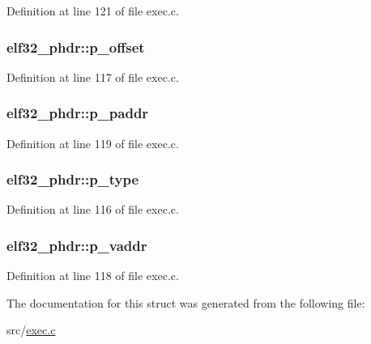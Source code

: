 Definition at line 121 of file exec.\+c.

\hypertarget{structelf32__phdr_af88bab5054a39a619ff2f8a5424c3316}{
\subsubsection[{p\+\_\+offset}]{ elf32\+\_\+phdr\+::p\+\_\+offset}}\label{structelf32__phdr_af88bab5054a39a619ff2f8a5424c3316}


Definition at line 117 of file exec.\+c.

\hypertarget{structelf32__phdr_a7a76a0d640bab3bfdbf48ffd14d40fe9}{
\subsubsection[{p\+\_\+paddr}]{ elf32\+\_\+phdr\+::p\+\_\+paddr}}\label{structelf32__phdr_a7a76a0d640bab3bfdbf48ffd14d40fe9}


Definition at line 119 of file exec.\+c.

\hypertarget{structelf32__phdr_ac875c2371d8cf5e6e2084050ae6ccf73}{
\subsubsection[{p\+\_\+type}]{ elf32\+\_\+phdr\+::p\+\_\+type}}\label{structelf32__phdr_ac875c2371d8cf5e6e2084050ae6ccf73}


Definition at line 116 of file exec.\+c.

\hypertarget{structelf32__phdr_a4ce34fb0d117afd27046b923756faa11}{
\subsubsection[{p\+\_\+vaddr}]{ elf32\+\_\+phdr\+::p\+\_\+vaddr}}\label{structelf32__phdr_a4ce34fb0d117afd27046b923756faa11}


Definition at line 118 of file exec.\+c.



The documentation for this struct was generated from the following file\+:\begin{DoxyCompactItemize}
\item 
src/\hyperlink{exec_8c}{exec.\+c}\end{DoxyCompactItemize}
